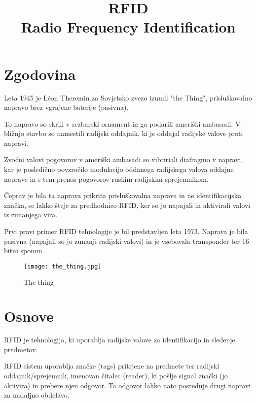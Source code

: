 \documentclass[]{article}
\title{RFID \\
       \large Radio Frequency Identification}
\date{}
\begin{document}
\maketitle

\clearpage

\tableofcontents

\clearpage

\section{Zgodovina}
Leta 1945 je Léon Theremin za Sovjetsko zvezo izumil "the Thing",
prislu\v{s}kovalno napravo brez vgrajene baterije (pasivna).

To napravo so skrili v rezbarski ornament in ga podarili ameri\v{s}ki
ambasadi. V bli\v{z}njo stavbo so namestili radijski oddajnik, ki je
oddajal radijske valove proti napravi.

Zvo\v{c}ni valovi pogovorov v ameri\v{s}ki ambasadi so vibririali
diafragmo v napravi, kar je posledi\v{c}no povzro\v{c}ilo modulacijo
oddanega radijskega valova oddajne naprave in s tem prenos pogovorov
ruskim radijskim sprejemnikom. 

\v{C}eprav je bila ta naprava prikrita prislu\v{s}kovalna naprava in
ne identifikacijska zna\v{c}ka, se lahko \v{s}teje za predhodnico
RFID, ker so jo napajali in aktivirali valovi iz zunanjega vira.

Prvi pravi primer RFID tehnologije je bil predstavljen leta 1973.
Naprava je bila pasivna (napajali so jo zunanji radijski valovi) in je
vsebovala transponder ter 16 bitni spomin.

\begin{figure}[H] %
  \centering
  \texttt{[image: the\_thing.jpg]}
  \caption{The thing}
\end{figure}

\section{Osnove}
RFID je tehnologija, ki uporablja radijske valove za identifikacijo
in sledenje predmetov.

RFID sistem uporablja zna\v{c}ke (tags) pritrjene na predmete ter
radijski oddajnik/sprejemnik, imenovan \v{c}italec (reader), ki
po\v{s}lje signal zna\v{c}ki (jo aktivira) in prebere njen odgovor.
Ta odgovor lahko nato posreduje drugi napravi za nadaljno obdelavo. \\
\end{document}
